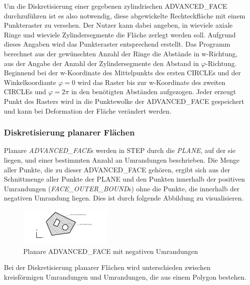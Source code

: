 Um die Diskretisierung einer gegebenen zylindrischen ADVANCED\_FACE durchzuführen ist es also notwendig, diese abgewickelte Rechteckfläche mit einem Punkteraster zu versehen. Der Nutzer kann dabei angeben, in wieviele axiale Ringe und wieviele Zylindersegmente die Fläche zerlegt werden soll. Aufgrund dieses Angaben wird das Punkteraster entsprechend erstellt. Das Programm berechnet aus der gewünschten Anzahl der Ringe die Abstände in w-Richtung, aus der Angabe der Anzahl der Zylindersegmente den Abstand in $\varphi$-Richtung. Beginnend bei der w-Koordinate des Mittelpunkts des ersten CIRCLEs und der Winkelkoordiante $\varphi = 0$ wird das Raster bis zur w-Koordinate des zweiten CIRCLEs und $\varphi = 2\pi$ in den benötigten Abständen aufgezogen. Jeder erzeugt Punkt des Rasters wird in die Punktewolke der ADVANCED\_FACE gespeichert und kann bei Deformation der Fläche verändert werden. 

\subsubsection{Diskretisierung planarer Flächen}

Planare \textit{ADVANCED\_FACE}s werden in STEP durch die \textit{PLANE}, auf der sie liegen, und einer bestimmten Anzahl an Umrandungen beschrieben. Die Menge aller Punkte, die zu dieser ADVANCED\_FACE gehören, ergibt sich aus der Schnittmenge aller Punkte der PLANE und den Punkten innerhalb der positiven Umrandungen (\textit{FACE\_OUTER\_BOUND}s) ohne die Punkte, die innerhalb der negativen Umrandung liegen. 
Dies ist durch folgende Abbildung zu visualisieren.

\begin{figure}[h]
	\centering
	
	\includegraphics[width=0.7\linewidth]{img/posnegbounds.pdf}
	
	\caption{Planare ADVANCED\_FACE mit negativen Umrandungen}
	\label{fig:posnegbounds}
	
\end{figure}

Bei der Diskretisierung planarer Flächen wird unterschieden zwischen kreisförmigen Umrandungen und Umrandungen, die aus einem Polygon bestehen.

